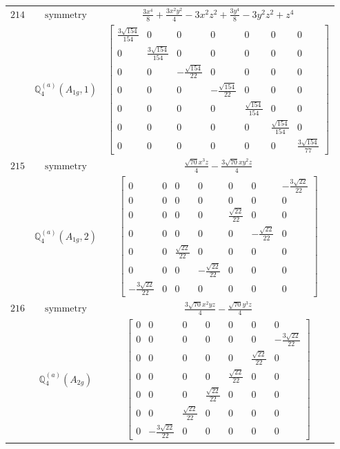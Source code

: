 \documentclass[fleqn,8pt,landscape]{jsarticle}
\begin{document}
\begin{longtable}{ccc}
$ 214 $ & $ \text{symmetry} $ & $ \frac{3 x^{4}}{8} + \frac{3 x^{2} y^{2}}{4} - 3 x^{2} z^{2} + \frac{3 y^{4}}{8} - 3 y^{2} z^{2} + z^{4} $ \\
$  $ & $ \mathbb{Q}_{4}^{(a)}(A_{1g},1) $ & $ \begin{bmatrix} \frac{3 \sqrt{154}}{154} & 0 & 0 & 0 & 0 & 0 & 0 \\ 0 & \frac{3 \sqrt{154}}{154} & 0 & 0 & 0 & 0 & 0 \\ 0 & 0 & - \frac{\sqrt{154}}{22} & 0 & 0 & 0 & 0 \\ 0 & 0 & 0 & - \frac{\sqrt{154}}{22} & 0 & 0 & 0 \\ 0 & 0 & 0 & 0 & \frac{\sqrt{154}}{154} & 0 & 0 \\ 0 & 0 & 0 & 0 & 0 & \frac{\sqrt{154}}{154} & 0 \\ 0 & 0 & 0 & 0 & 0 & 0 & \frac{3 \sqrt{154}}{77} \end{bmatrix} $ \\ \hline
$ 215 $ & $ \text{symmetry} $ & $ \frac{\sqrt{70} x^{3} z}{4} - \frac{3 \sqrt{70} x y^{2} z}{4} $ \\
$  $ & $ \mathbb{Q}_{4}^{(a)}(A_{1g},2) $ & $ \begin{bmatrix} 0 & 0 & 0 & 0 & 0 & 0 & - \frac{3 \sqrt{22}}{22} \\ 0 & 0 & 0 & 0 & 0 & 0 & 0 \\ 0 & 0 & 0 & 0 & \frac{\sqrt{22}}{22} & 0 & 0 \\ 0 & 0 & 0 & 0 & 0 & - \frac{\sqrt{22}}{22} & 0 \\ 0 & 0 & \frac{\sqrt{22}}{22} & 0 & 0 & 0 & 0 \\ 0 & 0 & 0 & - \frac{\sqrt{22}}{22} & 0 & 0 & 0 \\ - \frac{3 \sqrt{22}}{22} & 0 & 0 & 0 & 0 & 0 & 0 \end{bmatrix} $ \\ \hline
$ 216 $ & $ \text{symmetry} $ & $ \frac{3 \sqrt{70} x^{2} y z}{4} - \frac{\sqrt{70} y^{3} z}{4} $ \\
$  $ & $ \mathbb{Q}_{4}^{(a)}(A_{2g}) $ & $ \begin{bmatrix} 0 & 0 & 0 & 0 & 0 & 0 & 0 \\ 0 & 0 & 0 & 0 & 0 & 0 & - \frac{3 \sqrt{22}}{22} \\ 0 & 0 & 0 & 0 & 0 & \frac{\sqrt{22}}{22} & 0 \\ 0 & 0 & 0 & 0 & \frac{\sqrt{22}}{22} & 0 & 0 \\ 0 & 0 & 0 & \frac{\sqrt{22}}{22} & 0 & 0 & 0 \\ 0 & 0 & \frac{\sqrt{22}}{22} & 0 & 0 & 0 & 0 \\ 0 & - \frac{3 \sqrt{22}}{22} & 0 & 0 & 0 & 0 & 0 \end{bmatrix} $ \\ \hline

\end{longtable}
\end{document}
